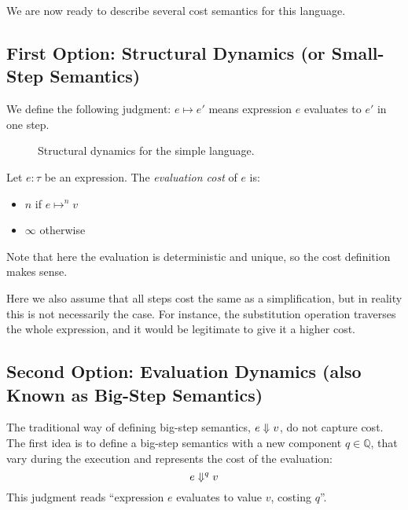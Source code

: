 \documentclass[ manuscript,screen, nonacm]{acmart}
\begin{document}
We are now ready to describe several cost semantics for this language.
\subsection{First Option: Structural Dynamics (or Small-Step Semantics)}

We define the following judgment: $e \mapsto e'$ means expression $e$ evaluates to $e'$ in one step.

\begin{figure}[htb]
    \caption{Structural dynamics for the simple language.}
    \label{fig:small-step}
\end{figure}

\begin{definition}\label{def:cost-small-step}
Let $e:\tau$ be an expression. The \emph{evaluation cost} of $e$ is:
\begin{itemize}
    \item $n$ if $e \mapsto ^n v$
    \item $\infty$ otherwise
\end{itemize}
\end{definition}
Note that here the evaluation is deterministic and unique, so the cost definition makes sense.

Here we also assume that all steps cost the same as a simplification, but in reality this is not necessarily the case. For instance, the substitution operation traverses the whole expression, and it would be legitimate
to give it a higher cost.

\subsection{Second Option: Evaluation Dynamics (also Known as Big-Step Semantics)}

The traditional way of defining big-step semantics, \(e \Downarrow^{} v\), do not capture cost.
The first idea is to define a big-step semantics with a new component \(q \in \mathbb{Q}\), that vary during
the execution and represents the cost of the evaluation:
\[
 e \Downarrow^{q} v
\]
This judgment reads ``expression $e$ evaluates to value $v$, costing $q$''.
\end{document}
